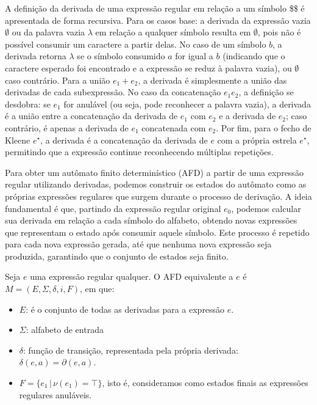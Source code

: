     A definição da derivada de uma expressão regular em relação a um
    símbolo \$\$ é apresentada de forma recursiva. Para os casos
    base: a derivada da expressão vazia \(\emptyset\) ou da palavra
    vazia \(\lambda\) em relação a qualquer símbolo resulta em
    \(\emptyset\), pois não é possível consumir um caractere a partir
    delas. No caso de um símbolo \(b\), a derivada retorna
    \(\lambda\) se o símbolo consumido \(a\) for igual a \(b\)
    (indicando que o caractere esperado foi encontrado e a expressão
    se reduz à palavra vazia), ou \(\emptyset\) caso contrário. Para
    a união \(e_1 + e_2\), a derivada é simplesmente a união das
    derivadas de cada subexpressão. No caso da concatenação \(e_1
    e_2\), a definição se desdobra: se \(e_1\)\hspace{0pt} for
    anulável (ou seja, pode reconhecer a palavra vazia), a derivada é
    a união entre a concatenação da derivada de \(e_1\) com \(e_2\) e
    a derivada de \(e_2\)\hspace{0pt}; caso contrário, é apenas a
    derivada de \(e_1\)\hspace{0pt} concatenada com \(e_2\). Por fim,
    para o fecho de Kleene \(e^\star\), a derivada é a concatenação
    da derivada de \(e\)\hspace{0pt} com a própria estrela
    \(e^\star\), permitindo que a expressão continue reconhecendo
    múltiplas repetições.

    Para obter um autômato finito determinístico (AFD) a partir de
    uma expressão regular utilizando derivadas, podemos construir os
    estados do autômato como as próprias expressões regulares que
    surgem durante o processo de derivação. A ideia fundamental é
    que, partindo da expressão regular original \(e_0\)\hspace{0pt},
    podemos calcular sua derivada em relação a cada símbolo do
    alfabeto, obtendo novas expressões que representam o estado após
    consumir aquele símbolo. Este processo é repetido para cada nova
    expressão gerada, até que nenhuma nova expressão seja produzida,
    garantindo que o conjunto de estados seja finito.

    \begin{Definition}
      Seja \(e\) uma expressão regular qualquer. O AFD
      equivalente a \(e\) é \(M = (E, \Sigma, \delta, i, F)\), em
      que:
      \begin{itemize}
        \item \(E\): é o conjunto de todas as derivadas para a
          expressão \(e\).
        \item \(\Sigma\): alfabeto de entrada
        \item \(\delta\): função de transição, representada pela própria
          derivada: \(\delta(e,a) = \partial(e,a)\).
        \item \(F = \{e_1 \,|\,
          \nu(e_1) = \top\}\), isto é, consideramos como estados finais
          as expressões regulares anuláveis.
      \end{itemize}
    \end{Definition}

